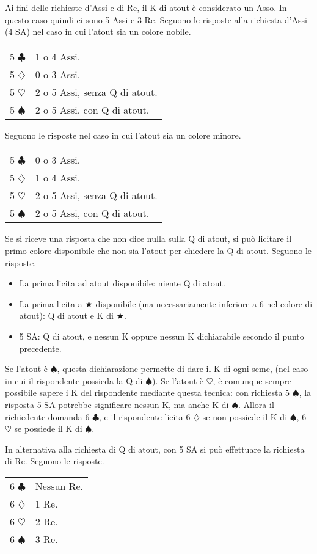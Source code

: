 \documentclass[a4paper,10pt]{article}
\renewcommand{\c}{$\clubsuit$\xspace}
\renewcommand{\d}{$\diamondsuit$\xspace}
\newcommand{\h}{$\heartsuit$\xspace}
\newcommand{\s}{$\spadesuit$\xspace}
\renewcommand{\j}{$\bigstar$\xspace}
\newcommand{\sa}{SA\xspace}
\newcommand{\smallspace}{\vskip0.3cm}
\newenvironment{twocol}
  {\smallspace\noindent\begin{tabular}{l p{0.78\textwidth}}}
  {\end{tabular}\smallspace}
\begin{document}
Ai fini delle richieste d'Assi e di Re, il K di atout è considerato un Asso. In questo caso quindi ci sono 5 Assi e 3 Re. Seguono le risposte alla richiesta d'Assi (4 \sa) nel caso in cui l'atout sia un colore nobile.
\begin{twocol}
5 \c & 1 o 4 Assi.\\
5 \d & 0 o 3 Assi.\\
5 \h & 2 o 5 Assi, senza Q di atout.\\
5 \s & 2 o 5 Assi, con Q di atout.\\
\end{twocol}
\noindent Seguono le risposte nel caso in cui l'atout sia un colore minore.
\begin{twocol}
5 \c & 0 o 3 Assi.\\
5 \d & 1 o 4 Assi.\\
5 \h & 2 o 5 Assi, senza Q di atout.\\
5 \s & 2 o 5 Assi, con Q di atout.\\
\end{twocol}

\noindent Se si riceve una risposta che non dice nulla sulla Q di atout, si può licitare il primo colore disponibile che non sia l'atout per chiedere la Q di atout. Seguono le risposte.

\begin{itemize}
 \item La prima licita ad atout disponibile: niente Q di atout.
 \item La prima licita a \j disponibile (ma necessariamente inferiore a 6 nel colore di atout): Q di atout e K di \j.
 \item 5 \sa: Q di atout, e nessun K oppure nessun K dichiarabile secondo il punto precedente.
\end{itemize}

Se l'atout è \s, questa dichiarazione permette di dare il K di ogni seme, (nel caso in cui il rispondente possieda la Q di \s). Se l'atout è \h, è comunque sempre possibile sapere i K del rispondente mediante questa tecnica: con richiesta 5 \s, la risposta 5 \sa potrebbe significare nessun K, ma anche K di \s.
Allora il richiedente domanda 6 \c, e il rispondente licita 6 \d se non possiede il K di \s, 6 \h se possiede il K di \s.


\smallspace

\noindent In alternativa alla richiesta di Q di atout, con 5 \sa si può effettuare la richiesta di Re. Seguono le risposte.

\begin{twocol}
6 \c & Nessun Re.\\
6 \d & 1 Re.\\
6 \h & 2 Re.\\
6 \s & 3 Re. \\
\end{twocol}
\end{document}
